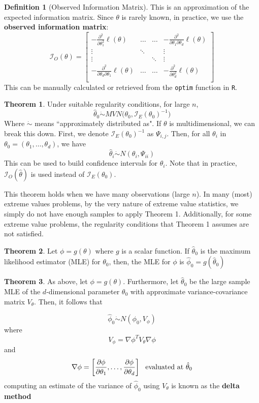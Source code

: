 \documentclass{article}
\theoremstyle{definition}
\newtheorem{theorem}{Theorem}
\theoremstyle{definition}
\newtheorem{definition}{Definition}
\def\l{\ell}
\def\inv{^{-1}}
\def\fish{\mathcal{I}}
\newcommand{\dotrel}[1]{\mathrel{\dot{#1}}}
\begin{document}
\begin{definition}[Observed Information Matrix]
This is an approximation of the expected information matrix. Since $\theta$ is rarely known, in practice, we use the \textbf{observed information matrix}:
\[\fish_O(\theta)= 
\begin{bmatrix}-\frac{\partial^2}{\partial \theta_1^2}\l(\theta)  &\hdots &\hdots & -\frac{\partial^2}{\partial \theta_1\partial\theta_d}\l(\theta) \\
\vdots& \ddots & & \vdots\\
\vdots& &\ddots &\vdots \\
-\frac{\partial^2}{\partial \theta_d\partial\theta_1}\l(\theta) & \hdots & \hdots& -\frac{\partial^2}{\partial \theta_d^2}\l(\theta) \\
\end{bmatrix}\]
This can be manually calculated or retrieved from the \texttt{optim} function in \texttt{R}.
\end{definition}

\begin{theorem}
Under suitable regularity conditions, for large $n$, 
\[\hat{\theta}_0 \dotrel{\sim} \textit{MVN}\Big(\theta_0, \fish_{E}(\theta_0)\inv \Big)\]
Where $\dotrel{\sim}$ means ``approximately distributed as". If $\theta$ is multidimensional, we can break this down. First, we denote $\fish_{E}(\theta_0)\inv$ as $\Psi_{i,j}$. Then, for all $\theta_i$ in $\theta_0=(\theta_1,\hdots, \theta_d)$, we have 
\[\hat\theta_i\dotrel{\sim} N(\theta_i, \Psi_{ii})\]
This can be used to build confidence intervals for $\theta_i$. Note that in practice, $\fish_O(\hat{\theta})$ is used instead of $\fish_E(\theta_0)$.

This theorem holds when we have many observations (large $n$). In many (most) extreme values problems, by the very nature of extreme value statistics, we simply do not have enough samples to apply Theorem 1. Additionally, for some extreme value problems, the regularity conditions that Theorem 1 assumes are not satisfied.
\end{theorem}
\begin{theorem}
Let $\phi=g(\theta)$ where $g$ is a scalar function. If $\hat{\theta}_0$ is the maximum likelihood estimator (MLE) for $\theta_0$, then, the MLE for $\phi$ is $\hat{\phi}_0=g(\hat{\theta}_0)$
\end{theorem}

\begin{theorem}As above, let $\phi=g(\theta)$. Furthermore, let $\hat{\theta}_0$ be the large sample MLE of the $d$-dimensional parameter $\theta_0$ with approximate variance-covariance matrix $V_{\theta}$. Then, it follows that

\[\hat{\phi}_0\dotrel{\sim} N(\phi_0, V_\phi)\]
where 
\[V_\phi= \nabla \phi^T V_\theta\nabla \phi\]
and
\[\nabla\phi=\bigg[ \frac{\partial \phi}{\partial\theta_1}, \hdots,\frac{\partial \phi}{\partial\theta_d} \bigg] \hspace{.3cm} \text{evaluated at }\hat{\theta}_0\]
computing an estimate of the variance of $\hat{\phi}_0$ using $V_{\theta}$ is known as the \textbf{delta method}
\end{theorem}
\end{document}

